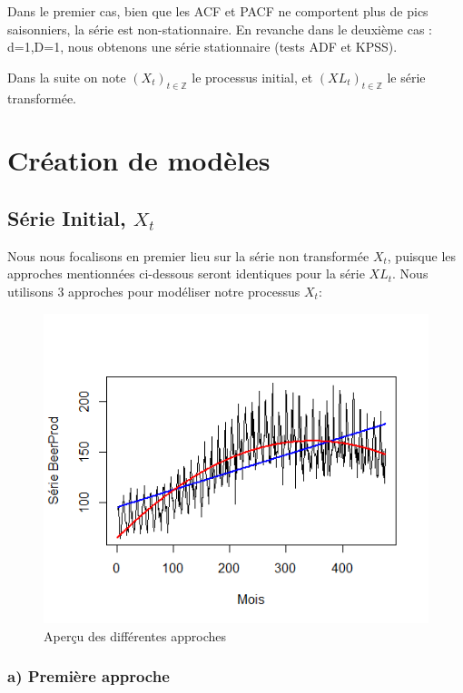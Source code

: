 \documentclass[12pt,a4paper]{book}
\newcommand{\1}{\mathds{1}}
\begin{document}
\vspace{80 mm}
\noindent
Dans le premier cas, bien que les ACF et PACF ne comportent plus de pics saisonniers, la série est non-stationnaire. En revanche dans le deuxième cas : d=1,D=1, nous obtenons une série stationnaire (tests ADF et KPSS). 


\noindent 
Dans la suite on note $(X_t)_{t\in \mathbb{Z}}$ le processus initial, et $(XL_t)_{t\in \mathbb{Z}}$  le série transformée.


\vspace{5 mm}
\section{Création de modèles}

\subsection{Série Initial, $X_t$}

Nous nous focalisons en premier lieu sur la série non transformée $X_t$, puisque les approches mentionnées ci-dessous seront identiques pour la série $XL_t$.
\noindent
Nous utilisons 3 approches pour modéliser notre processus $X_t$:

\begin{figure}[h]
\centering
    \includegraphics[scale = 0.9]{serie_tendances}  
\caption{Aperçu des différentes approches}
\end{figure}

\subsubsection{a) Première approche}
  
\end{document}
